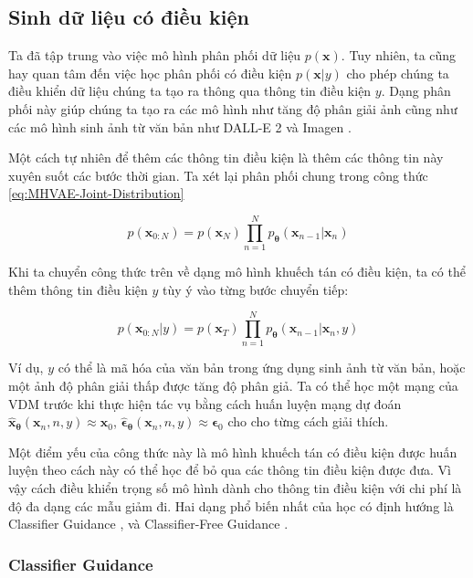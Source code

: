 \documentclass[14pt, a4paper]{article}
\numberwithin{equation}{section}
\numberwithin{figure}{section}
\numberwithin{dl}{section}
\numberwithin{md}{section}
\numberwithin{bd}{section}
\numberwithin{dn}{section}
\numberwithin{hq}{section}
\begin{document}
    \subsection{Sinh dữ liệu có điều kiện}

    Ta đã tập trung vào việc mô hình phân phối dữ liệu $p(\boldsymbol{x})$.
    Tuy nhiên, ta cũng hay quan tâm đến việc học phân phối có điều kiện $p(\boldsymbol{x} \vert y)$ cho phép chúng ta điều khiển dữ liệu chúng ta tạo ra thông qua thông tin điều kiện $y$.
    Dạng phân phối này giúp chúng ta tạo ra các mô hình như tăng độ phân giải ảnh \cite{ho2022cascaded} cũng như các mô hình sinh ảnh từ văn bản như DALL-E 2 \cite{ramesh2022hierarchical} và Imagen \cite{saharia2021image}.

    Một cách tự nhiên để thêm các thông tin điều kiện là thêm các thông tin này xuyên suốt các bước thời gian.
    Ta xét lại phân phối chung trong công thức \ref{eq:MHVAE-Joint-Distribution}

    \begin{equation*}
        p(\boldsymbol{x}_{0:N}) = p(\boldsymbol{x}_N) \prod_{n=1}^N p_{\boldsymbol{\theta}} (\boldsymbol{x}_{n-1} \vert \boldsymbol{x}_n)
    \end{equation*}

    Khi ta chuyển công thức trên về dạng mô hình khuếch tán có điều kiện, ta có thể thêm thông tin điều kiện $y$ tùy ý vào từng bước chuyển tiếp:

    \begin{equation}
        p(\boldsymbol{x}_{0:N} \vert y) = p(\boldsymbol{x}_T) \prod_{n=1}^N p_{\boldsymbol{\theta}} (\boldsymbol{x}_{n-1} \vert \boldsymbol{x}_n, y)
    \end{equation}

    Ví dụ, $y$ có thể là mã hóa của văn bản trong ứng dụng sinh ảnh từ văn bản, hoặc một ảnh độ phân giải thấp được tăng độ phân giả.
    Ta có thể học một mạng của VDM trước khi thực hiện tác vụ bằng cách huấn luyện mạng dự đoán $\hat{\boldsymbol{x}}_{\boldsymbol{\theta}} (\boldsymbol{x}_n, n, y) \approx \boldsymbol{x}_0$, $\hat{\boldsymbol{\epsilon}}_{\boldsymbol{\theta}} (\boldsymbol{x}_n, n, y) \approx \boldsymbol{\epsilon}_0$ cho cho từng cách giải thích.

    Một điểm yếu của công thức này là mô hình khuếch tán có điều kiện được huấn luyện theo cách này có thể học để bỏ qua các thông tin điều kiện được đưa.
    Vì vậy cách điều khiển trọng số mô hình dành cho thông tin điều kiện với chi phí là độ đa dạng các mẫu giảm đi.
    Hai dạng phổ biến nhất của học có định hướng là Classifier Guidance \cite{song2020score}, \cite{dhariwal2021diffusion} và Classifier-Free Guidance \cite{ho2021classifier}.

    \subsubsection{Classifier Guidance}
\end{document}
